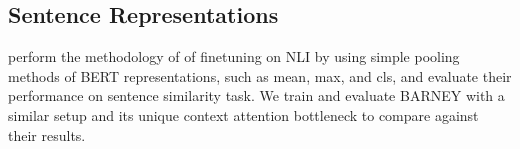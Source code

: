 




\subsection{Sentence Representations}
\citet{Reimers2019SentenceBERT} perform the methodology of \citet{conneau2017supervised} of finetuning on NLI by using simple pooling methods of BERT representations, such as mean, max, and cls, and evaluate their performance on sentence similarity task. We train and evaluate BARNEY with a similar setup and its unique context attention bottleneck to compare against their results.
 
